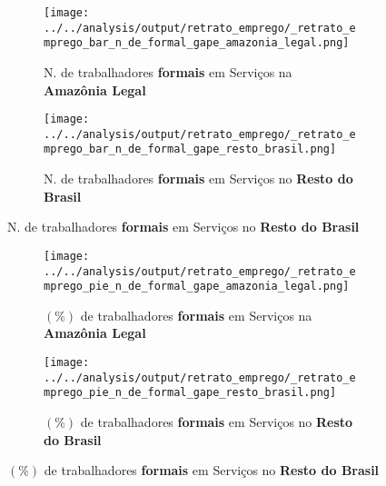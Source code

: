 \documentclass[11pt]{beamer}
\begin{document}
\begin{frame}[label=_retrato_emprego_bar_n_de_formal_gape]{}
\textit{\hyperlink{indice_principal}{}}
\begin{figure}
\centering
\begin{subfigure}{.5\textwidth}
  \centering
  \texttt{[image: ../../analysis/output/retrato\_emprego/\_retrato\_emprego\_bar\_n\_de\_formal\_gape\_amazonia\_legal.png]}
  \label{fig:_retrato_emprego_bar_n_de_formal_gape_amazonia_legal}
  \caption{{\tiny N. de trabalhadores \textbf{formais} em Serviços na \textbf{Amazônia Legal}}}
\end{subfigure}%
\begin{subfigure}{.5\textwidth}
  \centering
  \texttt{[image: ../../analysis/output/retrato\_emprego/\_retrato\_emprego\_bar\_n\_de\_formal\_gape\_resto\_brasil.png]}
  \label{fig:_retrato_emprego_bar_n_de_formal_gape_resto_brasil}
   \caption{{\tiny N. de trabalhadores \textbf{formais} em Serviços no \textbf{Resto do Brasil}}}
\end{subfigure}
\end{figure}
\end{frame}

\begin{frame}[label=_retrato_emprego_pie_n_de_formal_gape]{}
\textit{\hyperlink{indice_principal}{}}
\begin{figure}
\centering
\begin{subfigure}{.5\textwidth}
  \centering
  \texttt{[image: ../../analysis/output/retrato\_emprego/\_retrato\_emprego\_pie\_n\_de\_formal\_gape\_amazonia\_legal.png]}
  \label{fig:_retrato_emprego_pie_n_de_formal_gape_amazonia_legal}
  \caption{{\tiny $(\%)$ de trabalhadores \textbf{formais} em Serviços na \textbf{Amazônia Legal}}}
\end{subfigure}%
\begin{subfigure}{.5\textwidth}
  \centering
  \texttt{[image: ../../analysis/output/retrato\_emprego/\_retrato\_emprego\_pie\_n\_de\_formal\_gape\_resto\_brasil.png]}
  \label{fig:_retrato_emprego_pie_n_de_formal_gape_resto_brasil}
   \caption{{\tiny $(\%)$ de trabalhadores \textbf{formais} em Serviços no \textbf{Resto do Brasil}}}
\end{subfigure}
\end{figure}
\end{frame}
\end{document}
